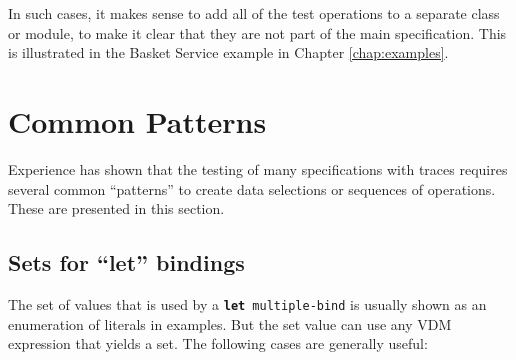 \documentclass{overturerepchap}
\begin{document}
In such cases, it makes sense to add all of the test operations to a separate
class or module, to make it clear that they are not part of the main
specification. This is illustrated in the Basket Service example in Chapter
\ref{chap:examples}.

\section{Common Patterns}

Experience has shown that the testing of many specifications with traces
requires several common ``patterns'' to create data selections or sequences of
operations. These are presented in this section.

\subsection{Sets for ``let'' bindings}

The set of values that is used by a \texttt{\textbf{let} multiple-bind} is usually
shown as an enumeration of literals in examples. But the set value can use any
VDM expression that yields a set. The following cases are generally useful:
\end{document}
